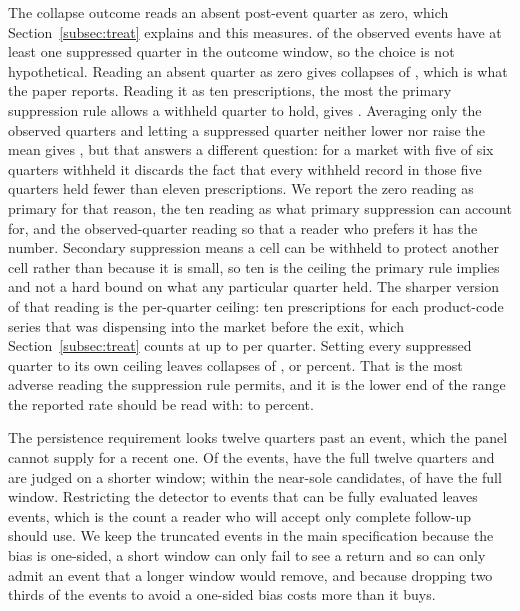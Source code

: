 \documentclass[pdflatex,sn-vancouver-num,Numbered]{sn-jnl}
\begin{document}
The collapse outcome reads an absent post-event quarter as zero, which
Section~\ref{subsec:treat} explains and this measures. \nOutcomeAffected of the
\nCauseTotal observed events have at least one suppressed quarter in the outcome window, so the
choice is not hypothetical. Reading an absent quarter as zero gives \nOutcomeZeroColl collapses
of \nCauseTotal, which is what the paper reports. Reading it as ten prescriptions, the most the
primary suppression rule allows a withheld quarter to hold, gives \nOutcomeTenColl. Averaging
only the observed quarters and letting a suppressed quarter neither lower nor raise the mean
gives \nOutcomeObsColl, but that answers a different question: for a market with five of six
quarters withheld it discards the fact that every withheld record in those five quarters held
fewer than eleven prescriptions. We
report the zero reading as primary for that reason, the ten reading as what primary suppression
can account for, and the observed-quarter reading so that a reader who prefers it has the number.
Secondary suppression means a cell can be withheld to protect another cell rather than because it
is small, so ten is the ceiling the primary rule implies and not a hard bound on what any
particular quarter held. The sharper version of that reading is the per-quarter ceiling: ten
prescriptions for each product-code series that was dispensing into the market before the exit,
which Section~\ref{subsec:treat} counts at up to \nSuppCellsMax per quarter. Setting every
suppressed quarter to its own ceiling leaves \nSuppCollCeiling collapses of \nCauseTotal, or
\nSuppRateCeiling percent. That is the most adverse reading the suppression rule permits, and it
is the lower end of the range the reported rate should be read with: \nSuppRateCeiling to
\nOutcomeZeroRate percent.

The persistence requirement looks twelve quarters past an event, which the panel cannot supply
for a recent one. Of the \nDetRangeDensePersist events, \nPersistFull have the full twelve
quarters and \nPersistTrunc are judged on a shorter window; within the near-sole candidates,
\nPersistSoleFull of \nDetSoleRangeDensePersist have the full window. Restricting the detector to
events that can be fully evaluated leaves \nPersistFullOnly events, which is the count a reader
who will accept only complete follow-up should use. We keep the truncated events in the main
specification because the bias is one-sided, a short window can only fail to see a return and so
can only admit an event that a longer window would remove, and because dropping two thirds of
the events to avoid a one-sided bias costs more than it buys.
\end{document}
